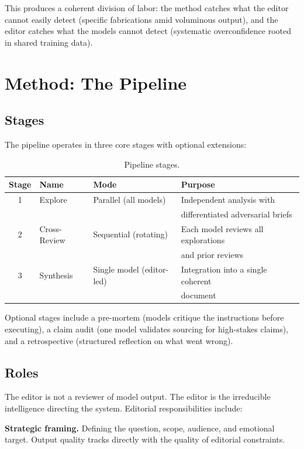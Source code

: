 \documentclass[11pt,letterpaper]{article}
\begin{document}
This produces a coherent division of labor: the method catches what the editor cannot easily detect (specific fabrications amid voluminous output), and the editor catches what the models cannot detect (systematic overconfidence rooted in shared training data).

\section{Method: The Pipeline}

\subsection{Stages}

The pipeline operates in three core stages with optional extensions:

\begin{table}[ht]
\centering
\caption{Pipeline stages.}
\label{tab:pipeline-stages}
\begin{tabular}{@{}clll@{}}
\toprule
\textbf{Stage} & \textbf{Name} & \textbf{Mode} & \textbf{Purpose} \\
\midrule
1 & Explore & Parallel (all models) & Independent analysis with \\
 & & & differentiated adversarial briefs \\
2 & Cross-Review & Sequential (rotating) & Each model reviews all explorations \\
 & & & and prior reviews \\
3 & Synthesis & Single model (editor-led) & Integration into a single coherent \\
 & & & document \\
\bottomrule
\end{tabular}
\end{table}

Optional stages include a pre-mortem (models critique the instructions before executing), a claim audit (one model validates sourcing for high-stakes claims), and a retrospective (structured reflection on what went wrong).

\subsection{Roles}

The editor is not a reviewer of model output. The editor is the irreducible intelligence directing the system. Editorial responsibilities include:

\textbf{Strategic framing.} Defining the question, scope, audience, and emotional target. Output quality tracks directly with the quality of editorial constraints.
\end{document}
